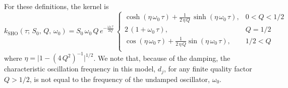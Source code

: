 \documentclass[manuscript, letterpaper]{aastex6}
\newcommand{\eqlabel}[1]{\label{eq:#1}}
\begin{document}
For these definitions, the kernel is
\begin{equation}\eqlabel{sho-kernel}
k_\mathrm{SHO}(\tau;\,S_0,\,Q,\,\omega_0) =
S_0\,\omega_0\,Q\,e^{-\frac{\omega_0\,\tau}{2Q}}\,
\begin{cases}
    \cosh{(\eta\,\omega_0\,\tau)} +
        \frac{1}{2\,\eta\,Q}\,\sinh{(\eta\,\omega_0\,\tau)}, & 0 < Q < 1/2\\
    2\,(1+\omega_0\,\tau), & Q = 1/2\\
    \cos{(\eta\,\omega_0\,\tau)} +
        \frac{1}{2\,\eta\,Q} \sin{(\eta\,\omega_0\,\tau)},& 1/2 < Q\\
\end{cases}
\end{equation}
where $\eta = \vert 1-(4\,Q^2)^{-1}\vert^{1/2}$.
We note that, because of the damping, the characteristic oscillation frequency
in this model, $d_j$, for any finite quality factor $Q > 1/2$, is not equal to
the frequency of the undamped oscillator, $\omega_0$.
\end{document}

